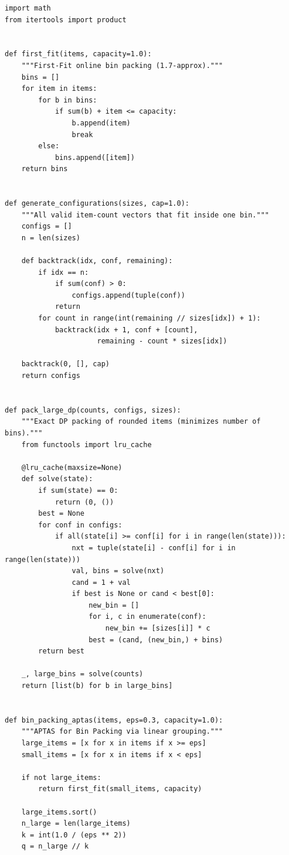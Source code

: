 \begin{lstlisting}[style=python, caption=Asymptotic PTAS for Bin Packing]
import math
from itertools import product


def first_fit(items, capacity=1.0):
    """First-Fit online bin packing (1.7-approx)."""
    bins = []
    for item in items:
        for b in bins:
            if sum(b) + item <= capacity:
                b.append(item)
                break
        else:
            bins.append([item])
    return bins


def generate_configurations(sizes, cap=1.0):
    """All valid item-count vectors that fit inside one bin."""
    configs = []
    n = len(sizes)

    def backtrack(idx, conf, remaining):
        if idx == n:
            if sum(conf) > 0:
                configs.append(tuple(conf))
            return
        for count in range(int(remaining // sizes[idx]) + 1):
            backtrack(idx + 1, conf + [count],
                      remaining - count * sizes[idx])

    backtrack(0, [], cap)
    return configs


def pack_large_dp(counts, configs, sizes):
    """Exact DP packing of rounded items (minimizes number of bins)."""
    from functools import lru_cache

    @lru_cache(maxsize=None)
    def solve(state):
        if sum(state) == 0:
            return (0, ())
        best = None
        for conf in configs:
            if all(state[i] >= conf[i] for i in range(len(state))):
                nxt = tuple(state[i] - conf[i] for i in range(len(state)))
                val, bins = solve(nxt)
                cand = 1 + val
                if best is None or cand < best[0]:
                    new_bin = []
                    for i, c in enumerate(conf):
                        new_bin += [sizes[i]] * c
                    best = (cand, (new_bin,) + bins)
        return best

    _, large_bins = solve(counts)
    return [list(b) for b in large_bins]


def bin_packing_aptas(items, eps=0.3, capacity=1.0):
    """APTAS for Bin Packing via linear grouping."""
    large_items = [x for x in items if x >= eps]
    small_items = [x for x in items if x < eps]
    
    if not large_items:
        return first_fit(small_items, capacity)
        
    large_items.sort()
    n_large = len(large_items)
    k = int(1.0 / (eps ** 2))
    q = n_large // k
    

\end{lstlisting}
